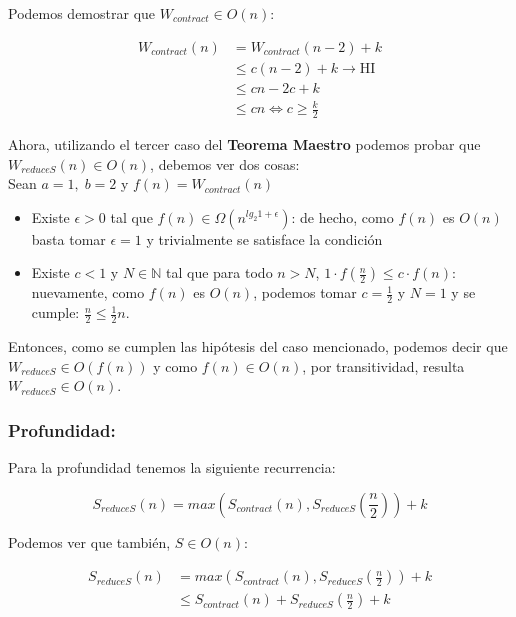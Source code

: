 \documentclass[11pt]{article}
\begin{document}
Podemos demostrar que $W_{contract} \in O(n)$:

\begin{align*}
    W_{contract}(n) & = W_{contract}(n - 2) + k \\
             & \leq c(n - 2) + k \rightarrow \text{HI}\\
             & \leq cn - 2c + k \\
             & \leq cn \iff c \geq \frac{k}{2}
\end{align*}

Ahora, utilizando el tercer caso del \textbf{Teorema Maestro} podemos probar que
$W_{reduceS}(n) \in O(n)$, debemos ver dos cosas: \\

Sean $a = 1, \; b = 2$ y $f(n) = W_{contract}(n)$

\begin{itemize}
    \item Existe $\epsilon > 0$ tal que $f(n) \in \Omega(n^{lg_2 1 + \epsilon})$:
          de hecho, como $f(n)$ es $O(n)$ basta tomar $\epsilon = 1$
          y trivialmente se satisface la condición
    \item  Existe $c < 1$ y $N \in \mathbb{N}$ tal que para todo $n > N$,
           $1 \cdot f(\frac{n}{2}) \leq c \cdot f(n)$: nuevamente, como $f(n)$ es $O(n)$, 
           podemos tomar $c = \frac{1}{2}$ y $N = 1$ y se cumple: $\frac{n}{2} \leq \frac{1}{2}n$. 
\end{itemize}

Entonces, como se cumplen las hipótesis del caso mencionado,
podemos decir que $W_{reduceS} \in O(f(n))$ y como $f(n) \in O(n)$, por transitividad,
resulta $W_{reduceS} \in O(n)$. \\

\subsubsection{Profundidad:}

Para la profundidad tenemos la siguiente recurrencia:

\begin{equation*}
    S_{reduceS}(n) = max(S_{contract}(n), S_{reduceS}(\frac{n}{2})) + k
\end{equation*}

Podemos ver que también, $S \in O(n)$:

\begin{align*}
    S_{reduceS}(n) & = max(S_{contract}(n), S_{reduceS}(\frac{n}{2})) + k \\
                   & \leq S_{contract}(n) + S_{reduceS}(\frac{n}{2}) + k
\end{align*}
\end{document}
